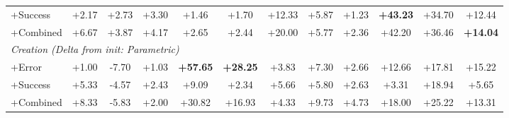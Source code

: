 \begin{table}[t]
{\begin{tabular}{@{}l ccccc ccccc c@{}}
\quad\quad +Success
    & \cellcolor{Green3!6}+2.17 & \cellcolor{Green3!15}+2.73 & \cellcolor{Green3!16}+3.30 & \cellcolor{Green3!2}+1.46 & \cellcolor{Green3!4}+1.70 & \cellcolor{Green3!27}+12.33 & \cellcolor{Green3!24}+5.87 & \cellcolor{Green3!10}+1.23 & \cellcolor{Green3!60}\textbf{+43.23} & \cellcolor{Green3!57}+34.70 & \cellcolor{Green3!40}+12.44 \\
\quad\quad +Combined
    & \cellcolor{Green3!18}+6.67 & \cellcolor{Green3!21}+3.87 & \cellcolor{Green3!20}+4.17 & \cellcolor{Green3!3}+2.65 & \cellcolor{Green3!5}+2.44 & \cellcolor{Green3!44}+20.00 & \cellcolor{Green3!24}+5.77 & \cellcolor{Green3!20}+2.36 & \cellcolor{Green3!59}+42.20 & \cellcolor{Green3!60}+36.46 & \cellcolor{Green3!45}\textbf{+14.04} \\[2pt]
\multicolumn{12}{l}{\quad\textit{Creation (Delta from init: Parametric)}} \\
\quad\quad +Error
    & \cellcolor{Green3!3}+1.00 & \cellcolor{Red1!43}-7.70 & \cellcolor{Green3!5}+1.03 & \cellcolor{Green3!60}\textbf{+57.65} & \cellcolor{Green3!60}\textbf{+28.25} & \cellcolor{Green3!9}+3.83 & \cellcolor{Green3!30}+7.30 & \cellcolor{Green3!22}+2.66 & \cellcolor{Green3!18}+12.66 & \cellcolor{Green3!29}+17.81 & \cellcolor{Green3!49}+15.22 \\
\quad\quad +Success
    & \cellcolor{Green3!14}+5.33 & \cellcolor{Red1!25}-4.57 & \cellcolor{Green3!12}+2.43 & \cellcolor{Green3!9}+9.09 & \cellcolor{Green3!5}+2.34 & \cellcolor{Green3!13}+5.66 & \cellcolor{Green3!24}+5.80 & \cellcolor{Green3!22}+2.63 & \cellcolor{Green3!5}+3.31 & \cellcolor{Green3!31}+18.94 & \cellcolor{Green3!18}+5.65 \\
\quad\quad +Combined
    & \cellcolor{Green3!22}+8.33 & \cellcolor{Red1!32}-5.83 & \cellcolor{Green3!10}+2.00 & \cellcolor{Green3!32}+30.82 & \cellcolor{Green3!36}+16.93 & \cellcolor{Green3!10}+4.33 & \cellcolor{Green3!40}+9.73 & \cellcolor{Green3!39}+4.73 & \cellcolor{Green3!25}+18.00 & \cellcolor{Green3!42}+25.22 & \cellcolor{Green3!43}+13.31 \\[2pt]
\bottomrule
\end{tabular}
}%
\end{table}
